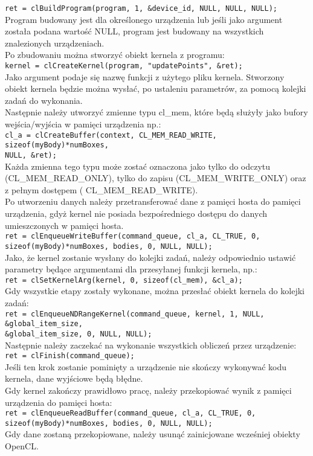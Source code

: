 \verb+ret = clBuildProgram(program, 1, &device_id, NULL, NULL, NULL);+\\
Program budowany jest dla określonego urządzenia lub jeśli jako argument została podana wartość NULL, program jest budowany na wszystkich znalezionych urządzeniach. \\
Po zbudowaniu można stworzyć obiekt kernela z programu:\\
\verb+kernel = clCreateKernel(program, "updatePoints", &ret);+\\
Jako argument podaje się nazwę funkcji z użytego pliku kernela. Stworzony obiekt kernela będzie można wysłać, po ustaleniu parametrów, za pomocą kolejki zadań do wykonania. \\
Następnie należy utworzyć zmienne typu cl\_mem, które będą służyły jako bufory wejścia/wyjścia w pamięci urządzenia np.:\\
\verb+cl_a = clCreateBuffer(context, CL_MEM_READ_WRITE, sizeof(myBody)*numBoxes,+\\
\verb+NULL, &ret);+\\
Każda zmienna tego typu może zostać oznaczona jako tylko do odczytu (CL\_MEM\_READ\_ONLY), tylko do zapisu (CL\_MEM\_WRITE\_ONLY) oraz z pełnym dostępem ( CL\_MEM\_READ\_WRITE). \\
Po utworzeniu danych należy przetransferować dane z pamięci hosta do pamięci urządzenia, gdyż kernel nie posiada bezpośredniego dostępu do danych umieszczonych w pamięci hosta. \\
\verb+ret = clEnqueueWriteBuffer(command_queue, cl_a, CL_TRUE, 0,+\\
\verb+sizeof(myBody)*numBoxes, bodies, 0, NULL, NULL);+\\
Jako, że kernel zostanie wysłany do kolejki zadań, należy odpowiednio ustawić parametry będące argumentami dla przesyłanej funkcji kernela, np.: \\
\verb+ret = clSetKernelArg(kernel, 0, sizeof(cl_mem), &cl_a);+\\
Gdy wszystkie etapy zostały wykonane, można przesłać obiekt kernela do kolejki zadań: \\
\verb+ret = clEnqueueNDRangeKernel(command_queue, kernel, 1, NULL, &global_item_size,+\\
\verb+&global_item_size, 0, NULL, NULL);+\\
Następnie należy zaczekać na wykonanie wszystkich obliczeń przez urządzenie:\\
\verb+ret = clFinish(command_queue);+\\
Jeśli ten krok zostanie pominięty a urządzenie nie skończy wykonywać kodu kernela, dane wyjściowe będą błędne. \\
Gdy kernel zakończy prawidłowo pracę, należy przekopiować wynik z pamięci urządzenia do pamięci hosta: \\
\verb+ret = clEnqueueReadBuffer(command_queue, cl_a, CL_TRUE, 0,+\\
\verb+sizeof(myBody)*numBoxes, bodies, 0, NULL, NULL);+\\
Gdy dane zostaną przekopiowane, należy usunąć zainicjowane wcześniej obiekty OpenCL. \\

